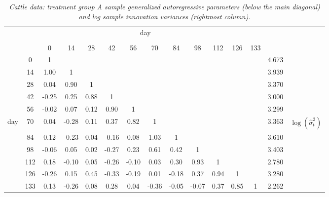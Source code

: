 \begin{table}[H] 
\begin{center}
\begin{tabular}{lc|ccccccccccc|cr}
 \multicolumn{14}{c}{day} \\
&&&&&&&&&&&&\\
& &  0 & 14 & 28 & 42 & 56 & 70 & 84 & 98 & 112 & 126 & 133  \\ 
  \cline{2-13}\noalign{\smallskip}  
&0 & 1 & &&&&&&&&& & 4.673& \\ 
&  14& 1.00 & 1&&&&&&&&&& 3.939 &\\ 
&  28 & 0.04 & 0.90 & 1 &&&&&&&&& 3.370&\\ 
&  42 & -0.25 & 0.25 & 0.88 & 1 &&&&&&&&3.000& \\ 
&  56 & -0.02 & 0.07 & 0.12 & 0.90 &1 &&&&&&& 3.299&\\ 
day &  70 & 0.04 & -0.28 & 0.11 & 0.37 & 0.82  &1&&&&&& 3.363 & $\log\left(\hat{\sigma}^2_t\right)$\\ 
 & 84 & 0.12 & -0.23 & 0.04 & -0.16 & 0.08 & 1.03  &1&&&&& 3.610\\ 
 & 98 & -0.06 & 0.05 & 0.02 & -0.27 & 0.23 & 0.61 & 0.42 &1&&&& 3.403&\\ 
 & 112 & 0.18 & -0.10 & 0.05 & -0.26 & -0.10 & 0.03 & 0.30 & 0.93&1&&& 2.780&  \\ 
 & 126 & -0.26 & 0.15 & 0.45 & -0.33 & -0.19 & 0.01 & -0.18 & 0.37 & 0.94 &1&&3.280& \\ 
 & 133 & 0.13 & -0.26 & 0.08 & 0.28 & 0.04 & -0.36 & -0.05 & -0.07 & 0.37 & 0.85 & 1  &2.262&\\ 
\end{tabular} 
\caption{\textit{Cattle data: treatment group A sample generalized autoregressive parameters (below the main diagonal) and log sample innovation variances (rightmost column).}}\label{table:sample-regressogram-garps}
\end{center}
\end{table}


